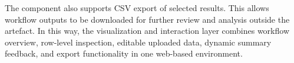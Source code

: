 The component also supports CSV export of selected results. This allows workflow outputs to be downloaded for further review and analysis outside the artefact. In this way, the visualization and interaction layer combines workflow overview, row-level inspection, editable uploaded data, dynamic summary feedback, and export functionality in one web-based environment.















